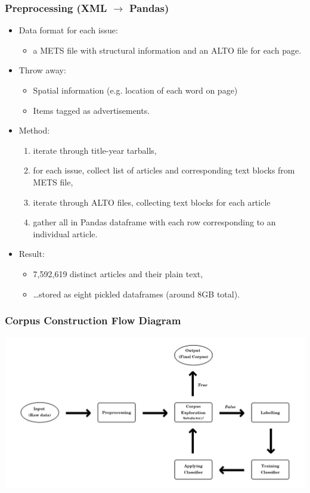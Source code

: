 \documentclass[10pt, compress]{beamer}
\begin{document}
\begin{frame}
	\frametitle{Preprocessing (XML $\rightarrow$ Pandas)}

	\pause

  \begin{itemize}[<+- | alert@+>]
		\item Data format for each issue:
		\begin{itemize}
			\item a METS file with structural information and an ALTO file for each page.
		\end{itemize}
		\item Throw away:
		\begin{itemize}
			\item Spatial information (e.g. location of each word on page)
			\item Items tagged as advertisements.
		\end{itemize}
		\item Method:
		\begin{enumerate}
			\item iterate through title-year tarballs,
			\item for each issue, collect list of articles and corresponding text blocks from METS file,
			\item iterate through ALTO files, collecting text blocks for each article
			\item gather all in Pandas dataframe with each row corresponding to an individual article.
		\end{enumerate}
		\item Result:
		\begin{itemize}
			\item 7,592,619 distinct articles and their plain text,
			\item \ldots stored as eight pickled dataframes (around 8GB total).
		\end{itemize}
	\end{itemize}

\end{frame}

\begin{frame}
	\frametitle{Corpus Construction Flow Diagram}
	\begin{center}
	\includegraphics[width=\textwidth]{images/flow_diagram.png}
	\end{center}
\end{frame}
\end{document}
